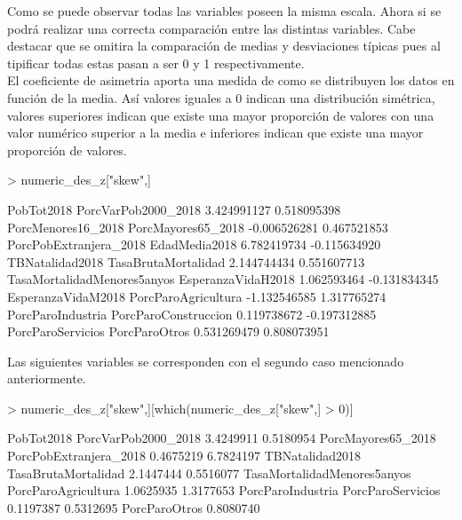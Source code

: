\documentclass[11pt]{article}
\begin{document}
Como se puede observar todas las variables poseen la misma escala. Ahora si se podrá realizar una correcta comparación entre las distintas variables. Cabe destacar que se omitira la comparación de medias y desviaciones típicas pues al tipificar todas estas pasan a ser 0 y 1 respectivamente. \\

El coeficiente de asimetria aporta una medida de como se distribuyen los datos en función de la media. Así valores iguales a 0 indican una distribución simétrica, valores superiores indican que existe una mayor proporción de valores con una valor numérico superior a la media e inferiores indican que existe una mayor proporción de valores.

\begin{Schunk}
\begin{Sinput}
> numeric_des_z["skew",]
\end{Sinput}
\begin{Soutput}
                 PobTot2018         PorcVarPob2000_2018 
                3.424991127                 0.518095398 
         PorcMenores16_2018          PorcMayores65_2018 
               -0.006526281                 0.467521853 
     PorcPobExtranjera_2018               EdadMedia2018 
                6.782419734                -0.115634920 
            TBNatalidad2018         TasaBrutaMortalidad 
                2.144744434                 0.551607713 
TasaMortalidadMenores5anyos          EsperanzaVidaH2018 
                1.062593464                -0.131834345 
         EsperanzaVidaM2018         PorcParoAgricultura 
               -1.132546585                 1.317765274 
          PorcParoIndustria        PorcParoConstruccion 
                0.119738672                -0.197312885 
          PorcParoServicios               PorcParoOtros 
                0.531269479                 0.808073951 
\end{Soutput}
\end{Schunk}
Las siguientes variables se corresponden con el segundo caso mencionado anteriormente.
\begin{Schunk}
\begin{Sinput}
> numeric_des_z["skew",][which(numeric_des_z["skew",] > 0)]
\end{Sinput}
\begin{Soutput}
                 PobTot2018         PorcVarPob2000_2018 
                  3.4249911                   0.5180954 
         PorcMayores65_2018      PorcPobExtranjera_2018 
                  0.4675219                   6.7824197 
            TBNatalidad2018         TasaBrutaMortalidad 
                  2.1447444                   0.5516077 
TasaMortalidadMenores5anyos         PorcParoAgricultura 
                  1.0625935                   1.3177653 
          PorcParoIndustria           PorcParoServicios 
                  0.1197387                   0.5312695 
              PorcParoOtros 
                  0.8080740 
\end{Soutput}
\end{Schunk}
\end{document}

